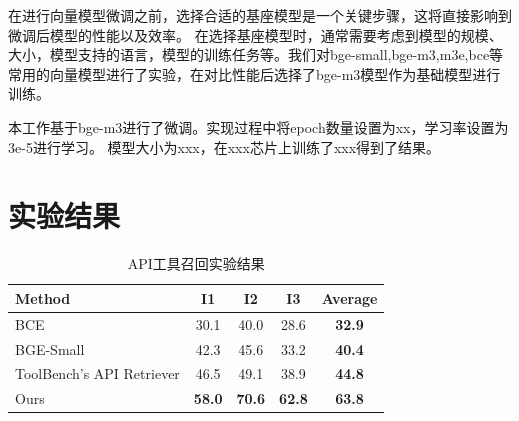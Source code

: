 在进行向量模型微调之前，选择合适的基座模型是一个关键步骤，这将直接影响到微调后模型的性能以及效率。
在选择基座模型时，通常需要考虑到模型的规模、大小，模型支持的语言，模型的训练任务等。我们对bge-small,bge-m3,m3e,bce等
常用的向量模型进行了实验，在对比性能后选择了bge-m3模型作为基础模型进行训练。


本工作基于bge-m3进行了微调。实现过程中将epoch数量设置为xx，学习率设置为3e-5进行学习。
模型大小为xxx，在xxx芯片上训练了xxx得到了结果。

\section{实验结果}

\begin{table}[!ht]
  \centering
  \caption{API工具召回实验结果}
  \label{tab:comparison}
  \begin{tabular}{lccc>{\bfseries}c} %
    \toprule
    \textbf{Method} & \textbf{I1} & \textbf{I2} & \textbf{I3} & \textbf{Average} \\ \midrule
    BCE         & 30.1 & 40.0 & 28.6 & 32.9 \\
    BGE-Small         & 42.3 & 45.6 & 33.2 & 40.4 \\
    ToolBench's API Retriever   & 46.5 & 49.1 & 38.9 & 44.8 \\
    Ours        & \textbf{58.0} & \textbf{70.6} & \textbf{62.8} & \textbf{63.8} \\ \bottomrule
  \end{tabular}
\end{table}





